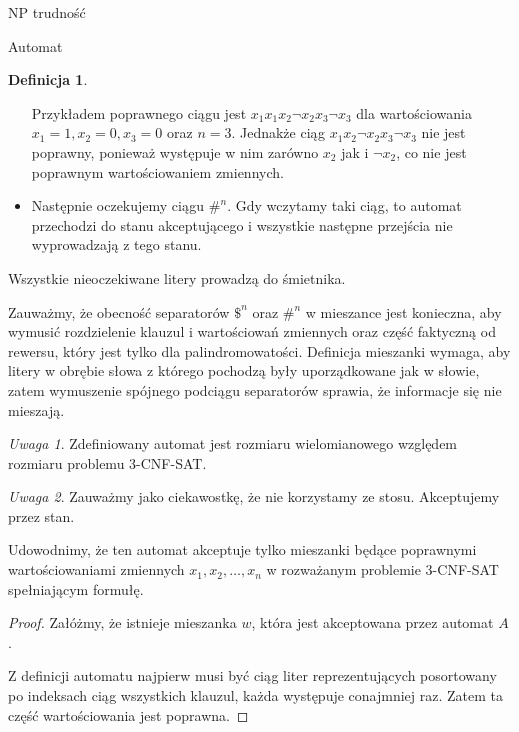 \documentclass{article}
\theoremstyle{definition}
\newtheorem{definition}{Definicja}[section]
\theoremstyle{remark}
\newtheorem{remark}{Uwaga}[section]
\begin{document}
\begin{section}{NP trudność}
\begin{subsection}{Automat}
\begin{definition}
\begin{itemize}
                   Przykładem poprawnego ciągu jest $x_1 x_1 x_2 \neg x_2 x_3 \neg x_3$ dla
                   wartościowania $x_1 = 1, x_2 = 0, x_3 = 0$ oraz $n = 3$. Jednakże ciąg $x_1 x_2
                       \neg x_2 x_3 \neg x_3$ nie jest poprawny, ponieważ występuje w nim zarówno
                   $x_2$ jak i $\neg x_2$, co nie jest poprawnym wartościowaniem zmiennych.

             \item Następnie oczekujemy ciągu $ \#^n$. Gdy wczytamy taki ciąg, to automat
                   przechodzi do stanu akceptującego i wszystkie następne przejścia nie
                   wyprowadzają z tego stanu.

         \end{itemize}

         Wszystkie nieoczekiwane litery prowadzą do śmietnika.

         Zauważmy, że obecność separatorów $ \$^n $ oraz $ \#^n $ w mieszance jest
         konieczna, aby wymusić rozdzielenie klauzul i wartościowań zmiennych oraz część
         faktyczną od rewersu, który jest tylko dla palindromowatości. Definicja
         mieszanki wymaga, aby litery w obrębie słowa z którego pochodzą były
         uporządkowane jak w słowie, zatem wymuszenie spójnego podciągu separatorów
         sprawia, że informacje się nie mieszają.

     \end{definition}

     \begin{remark}
         Zdefiniowany automat jest rozmiaru wielomianowego względem rozmiaru problemu
         3-CNF-SAT.
     \end{remark}

     \begin{remark}
         Zauważmy jako ciekawostkę, że nie korzystamy ze stosu. Akceptujemy przez stan.

     \end{remark}

     Udowodnimy, że ten automat akceptuje tylko mieszanki będące poprawnymi
     wartościowaniami zmiennych $x_1, x_2, \ldots, x_n$ w rozważanym problemie
     3-CNF-SAT spełniającym formułę.

     \begin{proof}
         Załóżmy, że istnieje mieszanka $w$, która jest akceptowana przez automat
         $A$.

         Z definicji automatu najpierw musi być ciąg liter reprezentujących posortowany
         po indeksach ciąg wszystkich klauzul, każda występuje conajmniej raz. Zatem ta
         część wartościowania jest poprawna.


\end{proof}
\end{subsection}
\end{section}
\end{document}
